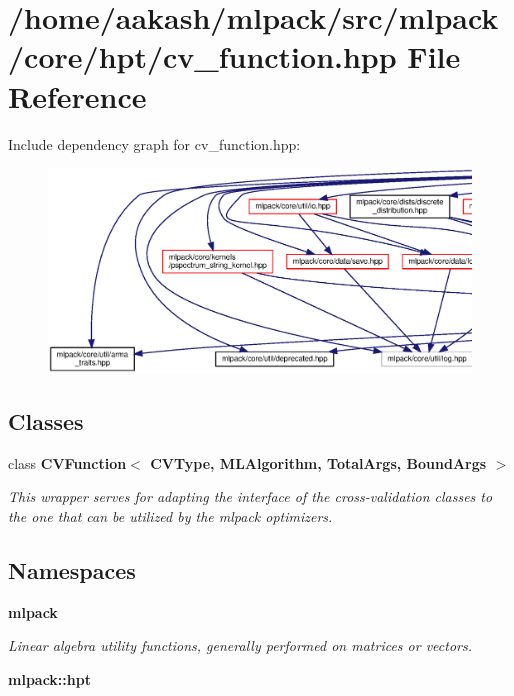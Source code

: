 \section{/home/aakash/mlpack/src/mlpack/core/hpt/cv\+\_\+function.hpp File Reference}
\label{cv__function_8hpp}
Include dependency graph for cv\+\_\+function.\+hpp\+:
\nopagebreak
\begin{figure}[H]
\begin{center}
\leavevmode
\includegraphics[width=350pt]{cv__function_8hpp__incl}
\end{center}
\end{figure}
\subsection*{Classes}
\begin{DoxyCompactItemize}
\item 
class \textbf{ C\+V\+Function$<$ C\+V\+Type, M\+L\+Algorithm, Total\+Args, Bound\+Args $>$}
\begin{DoxyCompactList}\small\item\em This wrapper serves for adapting the interface of the cross-\/validation classes to the one that can be utilized by the mlpack optimizers. \end{DoxyCompactList}\end{DoxyCompactItemize}
\subsection*{Namespaces}
\begin{DoxyCompactItemize}
\item 
 \textbf{ mlpack}
\begin{DoxyCompactList}\small\item\em Linear algebra utility functions, generally performed on matrices or vectors. \end{DoxyCompactList}\item 
 \textbf{ mlpack\+::hpt}
\end{DoxyCompactItemize}



